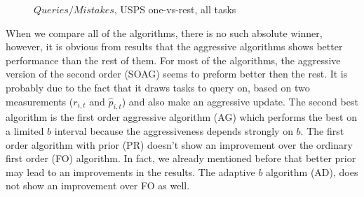 \begin{figure}[h]
\begin{centering}
\caption{${Queries}/{Mistakes}$, USPS one-vs-rest, all tasks}
\label{fig:qr_er_frac}
\end{centering}
\end{figure}


When we compare all of the algorithms, there is no such absolute winner, however, 
it is obvious from results that the aggressive algorithms shows better 
performance than the rest of them. For most of the algorithms, the aggressive version of the second order (SOAG) seems to preform better 
then the rest. It is probably due to the fact that it draws tasks to query on, based on two measurements 
($r_{i,t} $ and $\hat{p}_{i,t}$) and also make an aggressive update. The second best algorithm is  
the first order aggressive algorithm (AG) which performs the best on a 
limited $b$ interval because the aggressiveness depends strongly on $b$. The 
first order algorithm with prior (PR) doesn't show an improvement over the ordinary first order (FO) algorithm. 
In fact, we already mentioned before that better prior may lead to an improvements in the results. 
The adaptive $b$ algorithm (AD), does not show an improvement over FO as well. 

